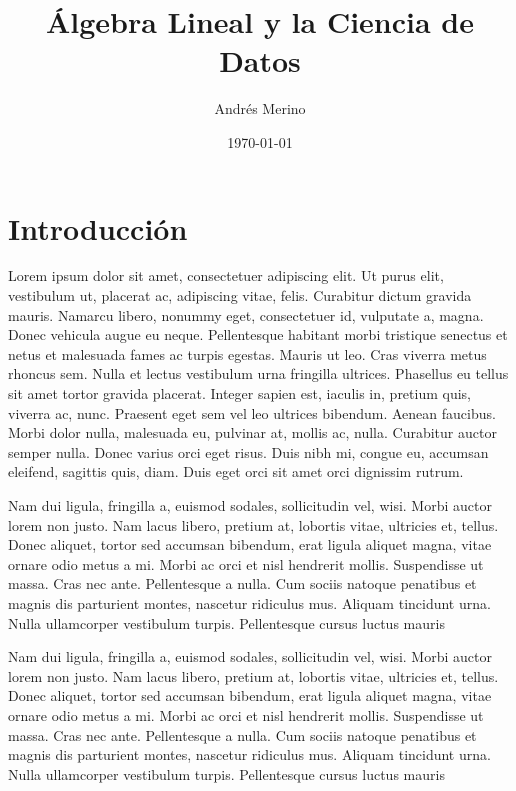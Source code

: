 \documentclass[11pt]{article}
\title{Álgebra Lineal y la Ciencia de Datos}
\author{Andrés Merino}
\affil{Carrera de Ciencia de Datos}
\date{\today}
\begin{document}
\maketitle
\thispagestyle{fancy}


\section{Introducción}

Lorem ipsum dolor sit amet, consectetuer adipiscing elit. Ut purus elit, vestibulum ut, placerat ac, adipiscing vitae, felis. Curabitur dictum gravida mauris. Namarcu libero, nonummy eget, consectetuer id, vulputate a, magna. Donec vehicula augue eu neque. Pellentesque habitant morbi tristique senectus et netus et malesuada fames ac turpis egestas. Mauris ut leo. Cras viverra metus rhoncus sem. Nulla et lectus vestibulum urna fringilla ultrices. Phasellus eu tellus sit amet tortor gravida placerat. Integer sapien est, iaculis in, pretium quis, viverra ac, nunc. Praesent eget sem vel leo ultrices bibendum. Aenean faucibus. Morbi dolor nulla, malesuada eu, pulvinar at, mollis ac, nulla. Curabitur auctor semper nulla. Donec varius orci eget risus. Duis nibh mi, congue eu, accumsan eleifend, sagittis quis, diam. Duis eget orci sit amet orci dignissim rutrum.

Nam dui ligula, fringilla a, euismod sodales, sollicitudin vel, wisi. Morbi auctor lorem non justo. Nam lacus libero, pretium at, lobortis vitae, ultricies et, tellus. Donec aliquet, tortor sed accumsan bibendum, erat ligula aliquet magna, vitae ornare odio metus a mi. Morbi ac orci et nisl hendrerit mollis. Suspendisse ut massa. Cras nec ante. Pellentesque a nulla. Cum sociis natoque penatibus et magnis dis parturient montes, nascetur ridiculus mus. Aliquam tincidunt urna. Nulla ullamcorper vestibulum turpis. Pellentesque cursus luctus mauris

Nam dui ligula, fringilla a, euismod sodales, sollicitudin vel, wisi. Morbi auctor lorem non justo. Nam lacus libero, pretium at, lobortis vitae, ultricies et, tellus. Donec aliquet, tortor sed accumsan bibendum, erat ligula aliquet magna, vitae ornare odio metus a mi. Morbi ac orci et nisl hendrerit mollis. Suspendisse ut massa. Cras nec ante. Pellentesque a nulla. Cum sociis natoque penatibus et magnis dis parturient montes, nascetur ridiculus mus. Aliquam tincidunt urna. Nulla ullamcorper vestibulum turpis. Pellentesque cursus luctus mauris
\end{document}
